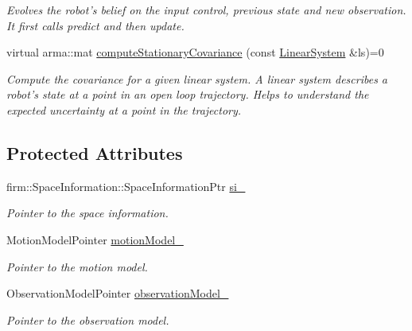 \begin{DoxyCompactItemize}
\begin{DoxyCompactList}\small\item\em \-Evolves the robot's belief on the input control, previous state and new observation. \-It first calls predict and then update. \end{DoxyCompactList}\item 
\hypertarget{class_kalman_filter_method_a8f9d8ae8cf4e3bd0138d731bd2539441}{virtual arma\-::mat \hyperlink{class_kalman_filter_method_a8f9d8ae8cf4e3bd0138d731bd2539441}{compute\-Stationary\-Covariance} (const \hyperlink{class_linear_system}{\-Linear\-System} \&ls)=0}\label{class_kalman_filter_method_a8f9d8ae8cf4e3bd0138d731bd2539441}

\begin{DoxyCompactList}\small\item\em \-Compute the covariance for a given linear system. \-A linear system describes a robot's state at a point in an open loop trajectory. \-Helps to understand the expected uncertainty at a point in the trajectory. \end{DoxyCompactList}\end{DoxyCompactItemize}
\subsection*{\-Protected \-Attributes}
\begin{DoxyCompactItemize}
\item 
\hypertarget{class_kalman_filter_method_a9a2355339d83656f5db7c86a60d12822}{firm\-::\-Space\-Information\-::\-Space\-Information\-Ptr \hyperlink{class_kalman_filter_method_a9a2355339d83656f5db7c86a60d12822}{si\-\_\-}}\label{class_kalman_filter_method_a9a2355339d83656f5db7c86a60d12822}

\begin{DoxyCompactList}\small\item\em \-Pointer to the space information. \end{DoxyCompactList}\item 
\hypertarget{class_kalman_filter_method_a5969ade2e4d4f70a1cccc2f2f2bf4bb3}{\-Motion\-Model\-Pointer \hyperlink{class_kalman_filter_method_a5969ade2e4d4f70a1cccc2f2f2bf4bb3}{motion\-Model\-\_\-}}\label{class_kalman_filter_method_a5969ade2e4d4f70a1cccc2f2f2bf4bb3}

\begin{DoxyCompactList}\small\item\em \-Pointer to the motion model. \end{DoxyCompactList}\item 
\hypertarget{class_kalman_filter_method_a43191b745846715c66854634ba58e85c}{\-Observation\-Model\-Pointer \hyperlink{class_kalman_filter_method_a43191b745846715c66854634ba58e85c}{observation\-Model\-\_\-}}\label{class_kalman_filter_method_a43191b745846715c66854634ba58e85c}

\begin{DoxyCompactList}\small\item\em \-Pointer to the observation model. \end{DoxyCompactList}\end{DoxyCompactItemize}
